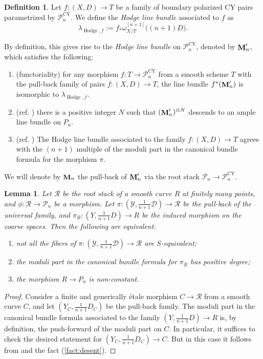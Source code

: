 \documentclass[a4paper,12pt]{amsart}
\DeclareMathOperator{\CY}{CY}
\DeclareMathOperator{\Hodge}{Hodge}
\newcommand{\sY}{{\mathscr{Y}}}
\newcommand{\sP}{{\mathscr{P}}}
\newcommand{\sD}{{\mathscr{D}}}
\newcommand{\cR}{{\mathcal{R}}}
\DeclareMathOperator{\bfM}{{\bf{M}}}
\newtheorem{lemma}[theorem]{Lemma}
\theoremstyle{definition}
\newtheorem{defn}[theorem]{Definition}
\theoremstyle{remark}
\begin{document}
\begin{defn}
    Let $f \colon (X,D) \rightarrow T$ be a family of boundary polarized CY pairs parametrized by $\sP_{n}^{\CY}$. We define the \emph{Hodge line bundle} associated to $f$ as
$$\lambda_{\Hodge,f} := f_*\omega^{[n+1]}
_{X/T}\big((n+1)D\big).$$
\end{defn}
By definition, this gives rise to the \emph{Hodge line bundle} on $\sP_{n}^{\CY}$, denoted by $\bfM_n'$, which satisfies the following:
\begin{enumerate}
    \item (functoriality) for any morphism $f\colon T\to \sP_{n}^{\CY}$ from a smooth scheme $T$ with the pull-back family of pairs $f\colon (X,D)\to T$, the line bundle $f^*(\bfM_n')$ is isomorphic to $\lambda_{\Hodge,f}$. 
    \item\label{fact:desent} (ref. \cite[\S 14.4]{ABBDILW23}) there is a positive integer $N$ such that $(\bfM_n')^{\otimes N}$ descends to an ample line bundle on $P_n$.
    \item (ref. \cite[Proposition 14.7 (3)]{ABBDILW23}) The Hodge line bundle associated to the family $f:(X,D)\rightarrow T$ agrees with the $(n+1)$ multiple of the moduli part in the canonical bundle formula for the morphism $\pi$.
\end{enumerate}


    We will denote by $\bfM_n$ the pull-back of $\bfM_n'$ via the root stack $\sP_n\to \sP_{n}^{\CY}$.


\begin{lemma}
    Let $\cR$ be the root stack of a smooth curve $R$ at finitely many points, and $\phi\colon\cR\to \sP_n$ be a morphism. Let $\pi\colon(\sY,\frac{1}{n+1}\sD)\to \cR$ be the pull-back of the universal family, and $\pi_R:(Y,\frac{1}{n+1}D)\rightarrow R$ be the induced morphism on the coarse spaces. Then the following are equivalent:
    \begin{enumerate}
        \item not all the fibers of $\pi\colon(\sY,\frac{1}{n+1}\sD)\to \cR$ are $S$-equivalent;
        \item the moduli part in the canonical bundle formula for $\pi_R$ has positive degree;
        \item the morphism $R\rightarrow P_n$ is non-constant.
    \end{enumerate}
\end{lemma}
\begin{proof}
    Consider a finite and generically \'etale morphism $C\to \cR$ from a smooth curve $C$, and let $(Y_C,\frac{1}{n+1}D_C)$ be the pull-back family. The moduli part in the canonical bundle formula associated to the family $(Y,\frac{1}{n+1}D)\to R$ is, by definition, the push-forward of the moduli part on $C$. In particular, it suffices to check the desired statement for $(Y_C,\frac{1}{n+1}D_C)\to C$. But in this case it follows from  and the fact (\ref{fact:desent}).
\end{proof}
\end{document}
